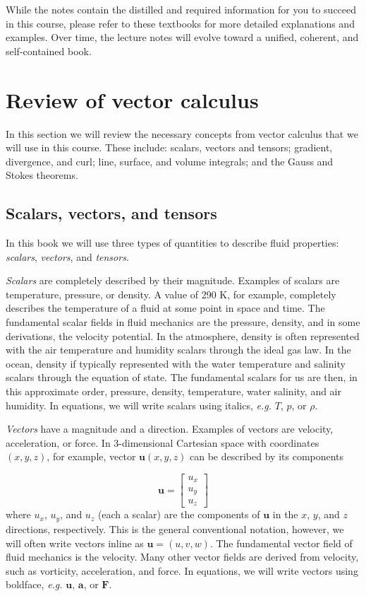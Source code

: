 \documentclass[12pt]{article}
\numberwithin{equation}{section}
\numberwithin{figure}{section}
\numberwithin{table}{section}
\begin{document}
While the notes contain the distilled and required information for you to
succeed in this course, please refer to these textbooks for more detailed
explanations and examples.
Over time, the lecture notes will evolve toward a unified, coherent, and
self-contained book.

\newpage
\section{Review of vector calculus}

In this section we will review the necessary concepts from vector calculus that
we will use in this course.
These include:
scalars, vectors and tensors;
gradient, divergence, and curl;
line, surface, and volume integrals;
and the Gauss and Stokes theorems.

\subsection{Scalars, vectors, and tensors}

In this book we will use three types of quantities to describe fluid
properties: \textit{scalars}, \textit{vectors}, and \textit{tensors}.

\textit{Scalars} are completely described by their magnitude.
Examples of scalars are temperature, pressure, or density.
A value of 290 K, for example, completely describes the temperature of a fluid
at some point in space and time.
The fundamental scalar fields in fluid mechanics are the pressure, density,
and in some derivations, the velocity potential.
In the atmosphere, density is often represented with the air temperature and
humidity scalars through the ideal gas law.
In the ocean, density if typically represented with the water temperature and
salinity scalars through the equation of state.
The fundamental scalars for us are then, in this approximate order,
pressure, density, temperature, water salinity, and air humidity.
In equations, we will write scalars using italics, \textit{e.g.} $T$, $p$, or $\rho$.

\textit{Vectors} have a magnitude and a direction.
Examples of vectors are velocity, acceleration, or force.
In 3-dimensional Cartesian space with coordinates $(x, y, z)$, for example,
vector $\mathbf{u}(x,y,z)$ can be described by its components

\begin{equation}
  \mathbf{u} =
  \begin{bmatrix}
    u_x \\
    u_y \\
    u_z
  \end{bmatrix}
  \label{eq:velocity}
\end{equation}
where $u_x$, $u_y$, and $u_z$ (each a scalar) are the components of $\mathbf{u}$
in the $x$, $y$, and $z$ directions, respectively.
This is the general conventional notation, however, we will often write vectors
inline as $\mathbf{u} = (u, v, w)$.
The fundamental vector field of fluid mechanics is the velocity.
Many other vector fields are derived from velocity, such as vorticity,
acceleration, and force.
In equations, we will write vectors using boldface, \textit{e.g.} $\mathbf{u}$,
$\mathbf{a}$, or $\mathbf{F}$.
\end{document}
